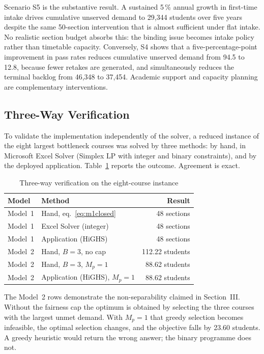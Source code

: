 \documentclass[conference]{IEEEtran}
\begin{document}
Scenario S5 is the substantive result. A sustained 5\,\% annual growth in first-time
intake drives cumulative unserved demand to 29{,}344 students over five years despite
the same 50-section intervention that is almost sufficient under flat intake. No
realistic section budget absorbs this: the binding issue becomes intake policy rather
than timetable capacity. Conversely, S4 shows that a five-percentage-point improvement
in pass rates reduces cumulative unserved demand from 94.5 to 12.8, because fewer
retakes are generated, and simultaneously reduces the terminal backlog from 46{,}348 to
37{,}454. Academic support and capacity planning are complementary interventions.

\subsection{Three-Way Verification}
\label{sec:verification}

To validate the implementation independently of the solver, a reduced instance of the
eight largest bottleneck courses was solved by three methods: by hand, in Microsoft Excel
Solver (Simplex LP with integer and binary constraints), and by the deployed application.
Table~\ref{tab:verify} reports the outcome. Agreement is exact.

\begin{table}[htbp]
\caption{Three-way verification on the eight-course instance}
\label{tab:verify}
\centering
\small
\begin{tabular}{llr}
\toprule
Model & Method & Result \\
\midrule
Model~1 & Hand, eq.~\eqref{eq:m1closed} & 48 sections \\
Model~1 & Excel Solver (integer)         & 48 sections \\
Model~1 & Application (HiGHS)            & 48 sections \\
\midrule
Model~2 & Hand, $B{=}3$, no cap          & 112.22 students \\
Model~2 & Hand, $B{=}3$, $M_p{=}1$       & 88.62 students \\
Model~2 & Application (HiGHS), $M_p{=}1$ & 88.62 students \\
\bottomrule
\end{tabular}
\end{table}

The Model~2 rows demonstrate the non-separability claimed in Section~III. Without the
fairness cap the optimum is obtained by selecting the three courses with the largest
unmet demand. With $M_p = 1$ that greedy selection becomes infeasible, the optimal
selection changes, and the objective falls by 23.60 students. A greedy heuristic would
return the wrong answer; the binary programme does not.
\end{document}

